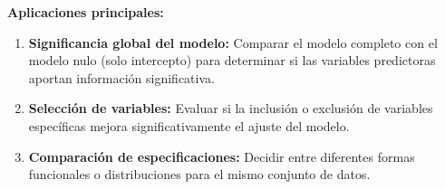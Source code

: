\documentclass[
  letterpaper,
  DIV=11,
  numbers=noendperiod]{scrreprt}
\begin{document}
\textbf{Aplicaciones principales:}

\begin{enumerate}
\def\labelenumi{\arabic{enumi}.}
\item
  \textbf{Significancia global del modelo:} Comparar el modelo completo
  con el modelo nulo (solo intercepto) para determinar si las variables
  predictoras aportan información significativa.
\item
  \textbf{Selección de variables:} Evaluar si la inclusión o exclusión
  de variables específicas mejora significativamente el ajuste del
  modelo.
\item
  \textbf{Comparación de especificaciones:} Decidir entre diferentes
  formas funcionales o distribuciones para el mismo conjunto de datos.
\end{enumerate}
\end{document}
